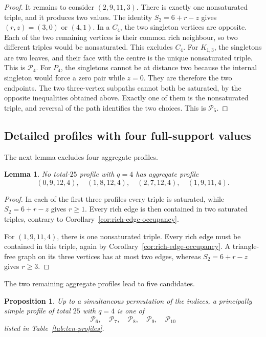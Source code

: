 \documentclass[11pt,a4paper]{article}
\newtheorem{proposition}[theorem]{Proposition}
\newtheorem{lemma}[theorem]{Lemma}
\theoremstyle{definition}
\begin{document}
\begin{proof}
It remains to consider $(2,9,11,3)$. There is exactly one nonsaturated
triple, and it produces two values. The identity $S_2=6+r-z$ gives
$(r,z)=(3,0)$ or $(4,1)$. In a $C_4$, the two singleton vertices are
opposite. Each of the two remaining vertices is their common rich
neighbour, so two different triples would be nonsaturated. This excludes
$C_4$. For $K_{1,3}$, the singletons are two leaves, and their face with
the centre is the unique nonsaturated triple. This is
$\mathcal P_4$. For $P_4$,
the singletons cannot be at distance two because the internal singleton
would force a zero pair while $z=0$. They are therefore the two
endpoints. The two three-vertex subpaths cannot both be saturated, by the
opposite inequalities obtained above. Exactly one of them is the
nonsaturated triple, and reversal of the path identifies the two
choices. This is $\mathcal P_5$.
\end{proof}

\subsection{Detailed profiles with four full-support values}

The next lemma excludes four aggregate profiles.

\begin{lemma}
\label{lem:q-four-first-removal}
No total-$25$ profile with $q=4$ has aggregate profile
$$
(0,9,12,4),\quad
(1,8,12,4),\quad
(2,7,12,4),\quad
(1,9,11,4).
$$
\end{lemma}

\begin{proof}
In each of the first three profiles every triple is saturated, while
$S_2=6+r-z$ gives $r\geq1$. Every rich edge is then contained in two
saturated triples, contrary to Corollary~\ref{cor:rich-edge-occupancy}.

For $(1,9,11,4)$, there is one nonsaturated triple. Every rich edge must
be contained in this triple, again by
Corollary~\ref{cor:rich-edge-occupancy}. A triangle-free graph on its three
vertices has at most two edges, whereas $S_2=6+r-z$ gives $r\geq3$.
\end{proof}

The two remaining aggregate profiles lead to five candidates.

\begin{proposition}
\label{prop:q-four-classification}
Up to a simultaneous permutation of the indices, a principally simple
profile of total $25$ with $q=4$ is one of
$$
\mathcal P_6,\quad
\mathcal P_7,\quad
\mathcal P_8,\quad
\mathcal P_9,\quad
\mathcal P_{10}
$$
listed in Table~\ref{tab:ten-profiles}.
\end{proposition}
\end{document}

